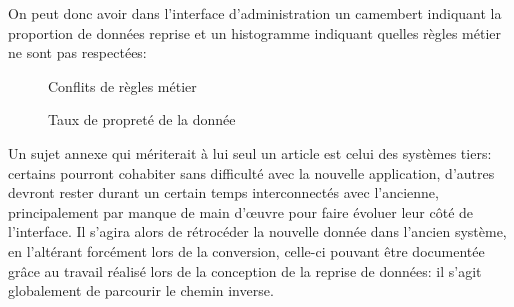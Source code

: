 \documentclass{book}
\def\angle{0}
\def\radius{3}
\def\cyclelist{{"bleuclair","vert"}}
\begin{document}
On peut donc avoir dans l'interface d'administration un camembert indiquant la proportion de données reprise et un histogramme indiquant quelles règles métier ne sont pas respectées:

\begin{figure}[!h]
    \begin{center}
    \end{center}
 \caption{Conflits de règles métier}
 \label{Conflits de règles métier}
\end{figure}

\begin{figure}[!h]
    \begin{center}
    \end{center}
 \caption{Taux de propreté de la donnée}
 \label{Taux de propreté de la donnée}
\end{figure}

Un sujet annexe qui mériterait à lui seul un article est celui des systèmes tiers: certains pourront cohabiter sans difficulté avec la nouvelle application, d'autres devront rester durant un certain temps interconnectés avec l'ancienne, principalement par manque de main d'œuvre pour faire évoluer leur côté de l'interface. Il s'agira alors de rétrocéder la nouvelle donnée dans l'ancien système, en l'altérant forcément lors de la conversion, celle-ci pouvant être documentée grâce au travail réalisé lors de la conception de la reprise de données: il s'agit globalement de parcourir le chemin inverse.
\end{document}
